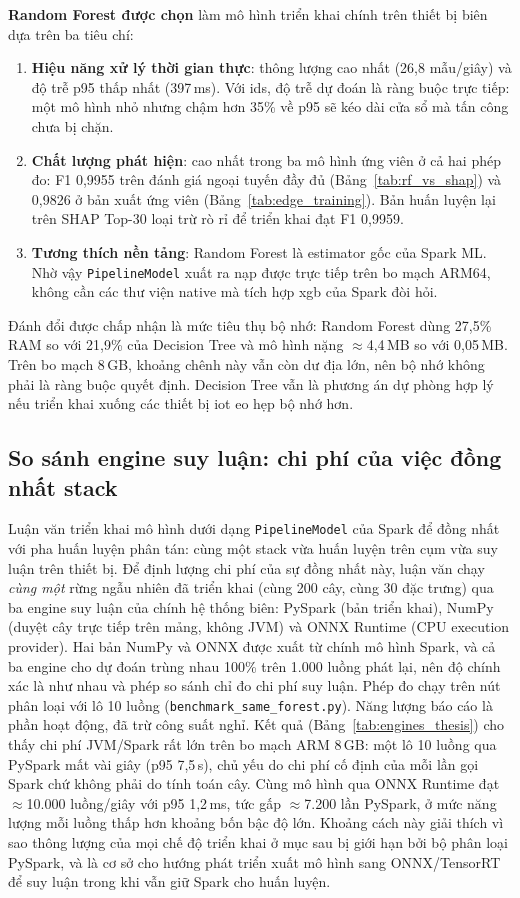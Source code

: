 \textbf{Random Forest được chọn} làm mô hình triển khai chính trên thiết bị biên dựa trên ba tiêu chí:
\begin{enumerate}
    \item \textbf{Hiệu năng xử lý thời gian thực}: thông lượng cao nhất (26{,}8 mẫu/giây) và độ trễ p95 thấp nhất (397\,ms). Với \ac{ids}, độ trễ dự đoán là ràng buộc trực tiếp: một mô hình nhỏ nhưng chậm hơn 35\% về p95 sẽ kéo dài cửa sổ mà tấn công chưa bị chặn.
    \item \textbf{Chất lượng phát hiện}: cao nhất trong ba mô hình ứng viên ở cả hai phép đo: F1 0{,}9955 trên đánh giá ngoại tuyến đầy đủ (Bảng~\ref{tab:rf_vs_shap}) và 0{,}9826 ở bản xuất ứng viên (Bảng~\ref{tab:edge_training}). Bản huấn luyện lại trên SHAP Top-30 loại trừ rò rỉ để triển khai đạt F1 0{,}9959.
    \item \textbf{Tương thích nền tảng}: Random Forest là estimator gốc của Spark ML. Nhờ vậy \texttt{PipelineModel} xuất ra nạp được trực tiếp trên bo mạch ARM64, không cần các thư viện native mà tích hợp \ac{xgb} của Spark đòi hỏi.
\end{enumerate}

Đánh đổi được chấp nhận là mức tiêu thụ bộ nhớ: Random Forest dùng 27{,}5\% RAM so với 21{,}9\% của Decision Tree và mô hình nặng $\approx$4{,}4\,MB so với 0{,}05\,MB. Trên bo mạch 8\,GB, khoảng chênh này vẫn còn dư địa lớn, nên bộ nhớ không phải là ràng buộc quyết định. Decision Tree vẫn là phương án dự phòng hợp lý nếu triển khai xuống các thiết bị \ac{iot} eo hẹp bộ nhớ hơn.

\subsection{So sánh engine suy luận: chi phí của việc đồng nhất stack}
\label{sec:engine-baseline-thesis}
Luận văn triển khai mô hình dưới dạng \texttt{PipelineModel} của Spark để đồng nhất với pha huấn luyện phân tán: cùng một stack vừa huấn luyện trên cụm vừa suy luận trên thiết bị. Để định lượng chi phí của sự đồng nhất này, luận văn chạy \emph{cùng một} rừng ngẫu nhiên đã triển khai (cùng 200 cây, cùng 30 đặc trưng) qua ba engine suy luận của chính hệ thống biên: PySpark (bản triển khai), NumPy (duyệt cây trực tiếp trên mảng, không JVM) và ONNX Runtime (CPU execution provider). Hai bản NumPy và ONNX được xuất từ chính mô hình Spark, và cả ba engine cho dự đoán trùng nhau 100\% trên 1.000 luồng phát lại, nên độ chính xác là như nhau và phép so sánh chỉ đo chi phí suy luận. Phép đo chạy trên nút phân loại với lô 10 luồng (\texttt{benchmark\_same\_forest.py}). Năng lượng báo cáo là phần hoạt động, đã trừ công suất nghỉ. Kết quả (Bảng~\ref{tab:engines_thesis}) cho thấy chi phí JVM/Spark rất lớn trên bo mạch ARM 8\,GB: một lô 10 luồng qua PySpark mất vài giây (p95 7{,}5\,s), chủ yếu do chi phí cố định của mỗi lần gọi Spark chứ không phải do tính toán cây. Cùng mô hình qua ONNX Runtime đạt $\approx$10.000 luồng/giây với p95 1{,}2\,ms, tức gấp $\approx$7.200 lần PySpark, ở mức năng lượng mỗi luồng thấp hơn khoảng bốn bậc độ lớn. Khoảng cách này giải thích vì sao thông lượng của mọi chế độ triển khai ở mục sau bị giới hạn bởi bộ phân loại PySpark, và là cơ sở cho hướng phát triển xuất mô hình sang ONNX/TensorRT để suy luận trong khi vẫn giữ Spark cho huấn luyện.

